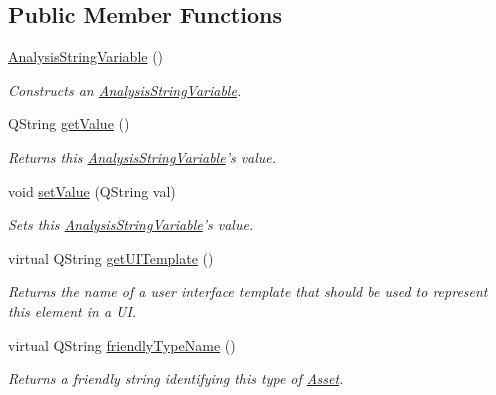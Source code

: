 \subsection*{Public Member Functions}
\begin{DoxyCompactItemize}
\item 
\hyperlink{class_picto_1_1_analysis_string_variable_a3851cfca5fd6fbd7c26db490e9683415}{Analysis\-String\-Variable} ()
\begin{DoxyCompactList}\small\item\em Constructs an \hyperlink{class_picto_1_1_analysis_string_variable}{Analysis\-String\-Variable}. \end{DoxyCompactList}\item 
\hypertarget{class_picto_1_1_analysis_string_variable_a2f912580968522aee53a81d35dfb5d73}{Q\-String \hyperlink{class_picto_1_1_analysis_string_variable_a2f912580968522aee53a81d35dfb5d73}{get\-Value} ()}\label{class_picto_1_1_analysis_string_variable_a2f912580968522aee53a81d35dfb5d73}

\begin{DoxyCompactList}\small\item\em Returns this \hyperlink{class_picto_1_1_analysis_string_variable}{Analysis\-String\-Variable}'s value. \end{DoxyCompactList}\item 
\hypertarget{class_picto_1_1_analysis_string_variable_a14b806ef88453a43e05d84b3b8f6f846}{void \hyperlink{class_picto_1_1_analysis_string_variable_a14b806ef88453a43e05d84b3b8f6f846}{set\-Value} (Q\-String val)}\label{class_picto_1_1_analysis_string_variable_a14b806ef88453a43e05d84b3b8f6f846}

\begin{DoxyCompactList}\small\item\em Sets this \hyperlink{class_picto_1_1_analysis_string_variable}{Analysis\-String\-Variable}'s value. \end{DoxyCompactList}\item 
\hypertarget{class_picto_1_1_analysis_string_variable_a9a5648ac0523a2ec6c34e49d2a9c9590}{virtual Q\-String \hyperlink{class_picto_1_1_analysis_string_variable_a9a5648ac0523a2ec6c34e49d2a9c9590}{get\-U\-I\-Template} ()}\label{class_picto_1_1_analysis_string_variable_a9a5648ac0523a2ec6c34e49d2a9c9590}

\begin{DoxyCompactList}\small\item\em Returns the name of a user interface template that should be used to represent this element in a U\-I. \end{DoxyCompactList}\item 
virtual Q\-String \hyperlink{class_picto_1_1_analysis_string_variable_a01b54b63739dd911cbb093aad4a53282}{friendly\-Type\-Name} ()
\begin{DoxyCompactList}\small\item\em Returns a friendly string identifying this type of \hyperlink{class_picto_1_1_asset}{Asset}. \end{DoxyCompactList}\end{DoxyCompactItemize}
